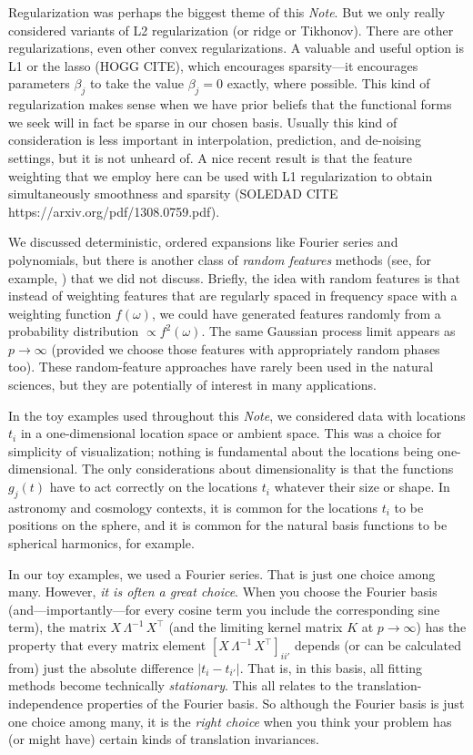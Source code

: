\documentclass[12pt,letterpaper]{article}
\newcommand{\documentname}{\textsl{Note}}
\begin{document}
Regularization was perhaps the biggest theme of this \documentname.
But we only really considered variants of L2 regularization (or ridge or Tikhonov).
There are other regularizations, even other convex regularizations.
A valuable and useful option is L1 or the lasso (HOGG CITE), which encourages sparsity---it encourages parameters $\beta_j$ to take the value $\beta_j=0$ exactly, where possible.
This kind of regularization makes sense when we have prior beliefs that the functional forms we seek will in fact be sparse in our chosen basis.
Usually this kind of consideration is less important in interpolation, prediction, and de-noising settings, but it is not unheard of.
A nice recent result is that the feature weighting that we employ here can be used with L1 regularization to obtain simultaneously smoothness and sparsity (SOLEDAD CITE https://arxiv.org/pdf/1308.0759.pdf).

We discussed deterministic, ordered expansions like Fourier series and polynomials, but there is another class of \emph{random features} methods (see, for example, \citealt{rahimi2007random}) that we did not discuss.
Briefly, the idea with random features is that instead of weighting features that are regularly spaced in frequency space with a weighting function $f(\omega)$, we could have generated features randomly from a probability distribution $\propto f^2(\omega)$.
The same Gaussian process limit appears as $p\rightarrow\infty$ (provided we choose those features with appropriately random phases too).
These random-feature approaches have rarely been used in the natural sciences, but they are potentially of interest in many applications.

In the toy examples used throughout this \documentname, we considered data with locations $t_i$ in a one-dimensional location space or ambient space.
This was a choice for simplicity of visualization; nothing is fundamental about the locations being one-dimensional.
The only considerations about dimensionality is that the functions $g_j(t)$ have to act correctly on the locations $t_i$ whatever their size or shape.
In astronomy and cosmology contexts, it is common for the locations $t_i$ to be positions on the sphere, and it is common for the natural basis functions to be spherical harmonics, for example.

In our toy examples, we used a Fourier series.
That is just one choice among many.
However, \emph{it is often a great choice}.
When you choose the Fourier basis (and---importantly---for every cosine term you include the corresponding sine term), the matrix $X\,\Lambda^{-1}\,X^\top$ (and the limiting kernel matrix $K$ at $p\rightarrow\infty$) has the property that every matrix element $[X\,\Lambda^{-1}\,X^\top]_{ii'}$ depends (or can be calculated from) just the absolute difference $|t_i-t_{i'}|$.
That is, in this basis, all fitting methods become technically \emph{stationary}.
This all relates to the translation-independence properties of the Fourier basis.
So although the Fourier basis is just one choice among many, it is the \emph{right choice} when you think your problem has (or might have) certain kinds of translation invariances.
\end{document}
